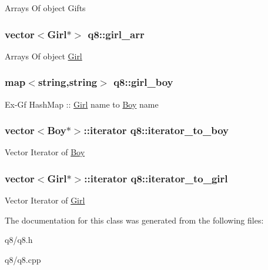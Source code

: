 Arrays Of object Gifts \hypertarget{classq8_aa44ab411ff58c8aa24f34c7bf4cabef2}{
\subsubsection[{girl\-\_\-arr}]{\setlength{\rightskip}{0pt plus 5cm}vector$<${\bf Girl}$\ast$$>$ q8\-::girl\-\_\-arr}}\label{classq8_aa44ab411ff58c8aa24f34c7bf4cabef2}
Arrays Of object \hyperlink{class_girl}{Girl} \hypertarget{classq8_a4e1918da4953e5cd1f037982dacc9a4e}{
\subsubsection[{girl\-\_\-boy}]{\setlength{\rightskip}{0pt plus 5cm}map$<$string,string$>$ q8\-::girl\-\_\-boy}}\label{classq8_a4e1918da4953e5cd1f037982dacc9a4e}
Ex-\/\-Gf Hash\-Map \-:\-: \hyperlink{class_girl}{Girl} name to \hyperlink{class_boy}{Boy} name \hypertarget{classq8_aee64e9b768b3d8a13db1814a8b443101}{
\subsubsection[{iterator\-\_\-to\-\_\-boy}]{\setlength{\rightskip}{0pt plus 5cm}vector$<${\bf Boy}$\ast$$>$\-::iterator q8\-::iterator\-\_\-to\-\_\-boy}}\label{classq8_aee64e9b768b3d8a13db1814a8b443101}
Vector Iterator of \hyperlink{class_boy}{Boy} \hypertarget{classq8_a904461d8b367f53e23c7e865ef1996b3}{
\subsubsection[{iterator\-\_\-to\-\_\-girl}]{\setlength{\rightskip}{0pt plus 5cm}vector$<${\bf Girl}$\ast$$>$\-::iterator q8\-::iterator\-\_\-to\-\_\-girl}}\label{classq8_a904461d8b367f53e23c7e865ef1996b3}
Vector Iterator of \hyperlink{class_girl}{Girl} 

The documentation for this class was generated from the following files\-:\begin{DoxyCompactItemize}
\item 
q8/q8.\-h\item 
q8/q8.\-cpp\end{DoxyCompactItemize}
